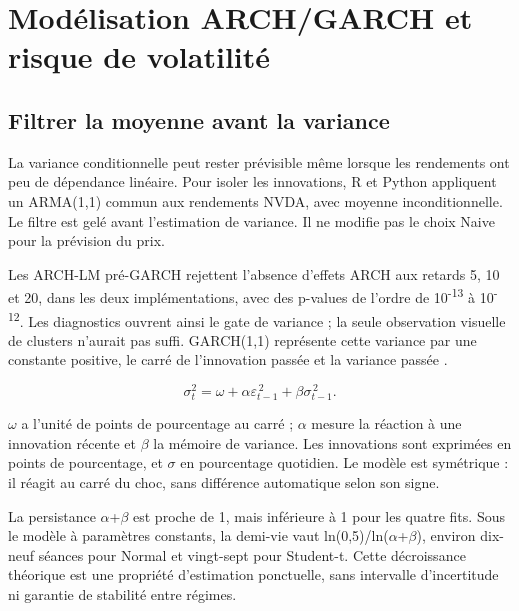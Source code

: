 \section{Modélisation ARCH/GARCH et risque de volatilité}
\label{sec:garch}

\subsection{Filtrer la moyenne avant la variance}



La variance conditionnelle peut rester prévisible même lorsque les rendements ont peu de dépendance linéaire. Pour isoler les innovations, R et Python appliquent un ARMA(1,1) commun aux rendements NVDA, avec moyenne inconditionnelle. Le filtre est gelé avant l’estimation de variance. Il ne modifie pas le choix Naive pour la prévision du prix.



Les ARCH-LM pré-GARCH rejettent l’absence d’effets ARCH aux retards 5, 10 et 20, dans les deux implémentations, avec des p-values de l’ordre de 10\textsuperscript{-13} à 10\textsuperscript{-12}. Les diagnostics ouvrent ainsi le gate de variance ; la seule observation visuelle de clusters n’aurait pas suffi. GARCH(1,1) représente cette variance par une constante positive, le carré de l’innovation passée et la variance passée \cite{R9}.



\begin{equation}\label{eq:garch} \sigma_t^2=\omega+\alpha\varepsilon_{t-1}^{\,2}+\beta\sigma_{t-1}^{\,2}.\end{equation}



\(\omega\) a l’unité de points de pourcentage au carré ; \(\alpha\) mesure la réaction à une innovation récente et \(\beta\) la mémoire de variance. Les innovations sont exprimées en points de pourcentage, et \(\sigma\) en pourcentage quotidien. Le modèle est symétrique : il réagit au carré du choc, sans différence automatique selon son signe.







La persistance \(\alpha\)+\(\beta\) est proche de 1, mais inférieure à 1 pour les quatre fits. Sous le modèle à paramètres constants, la demi-vie vaut ln(0,5)/ln(\(\alpha\)+\(\beta\)), environ dix-neuf séances pour Normal et vingt-sept pour Student-t. Cette décroissance théorique est une propriété d’estimation ponctuelle, sans intervalle d’incertitude ni garantie de stabilité entre régimes.



